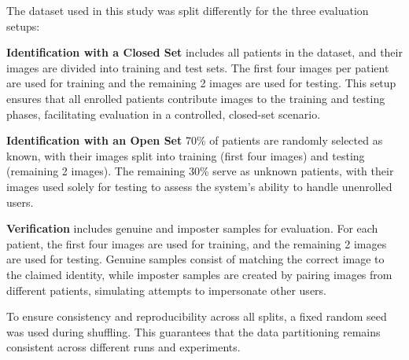 The dataset used in this study was split differently for the three evaluation setups:

\textbf{Identification with a Closed Set} includes all patients in the dataset, and their images are divided into training and test sets. The first four images per patient are used for training and the remaining 2 images are used for testing. This setup ensures that all enrolled patients contribute images to the training and testing phases, facilitating evaluation in a controlled, closed-set scenario.

\textbf{Identification with an Open Set} 70\% of patients are randomly selected as known, with their images split into training (first four images) and testing (remaining 2 images). The remaining 30\% serve as unknown patients, with their images used solely for testing to assess the system's ability to handle unenrolled users. 

\textbf{Verification} includes genuine and imposter samples for evaluation. For each patient, the first four images are used for training, and the remaining 2 images are used for testing. Genuine samples consist of matching the correct image to the claimed identity, while imposter samples are created by pairing images from different patients, simulating attempts to impersonate other users. 

To ensure consistency and reproducibility across all splits, a fixed random seed was used during shuffling. This guarantees that the data partitioning remains consistent across different runs and experiments.